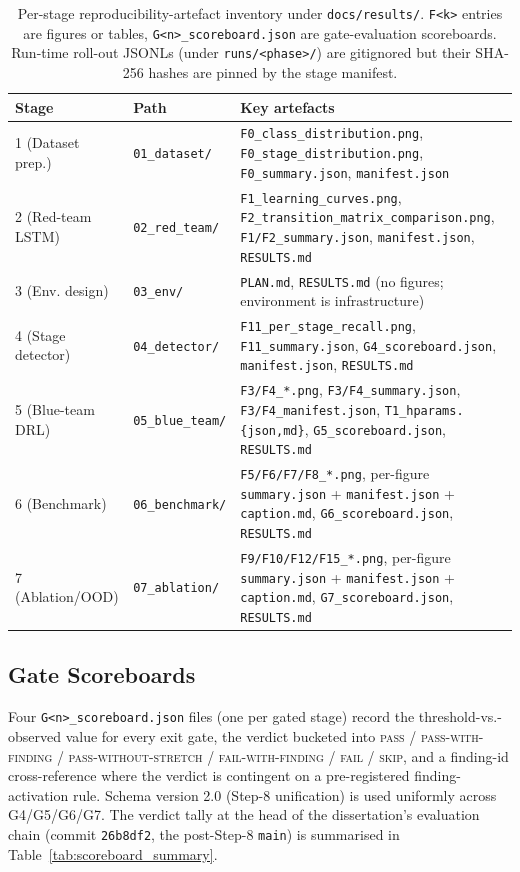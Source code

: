 \begin{table}[!htbp]
\centering
\caption{Per-stage reproducibility-artefact inventory under \texttt{docs/results/}. \texttt{F<k>} entries are figures or tables, \texttt{G<n>\_scoreboard.json} are gate-evaluation scoreboards. Run-time roll-out JSONLs (under \texttt{runs/<phase>/}) are gitignored but their SHA-256 hashes are pinned by the stage manifest.}
\label{tab:manifest_inventory}
\begin{tabular}{l l l}
\hline
Stage & Path & Key artefacts \\
\hline
1 (Dataset prep.) & \texttt{01\_dataset/} & \texttt{F0\_class\_distribution.png}, \texttt{F0\_stage\_distribution.png}, \texttt{F0\_summary.json}, \texttt{manifest.json} \\
2 (Red-team LSTM) & \texttt{02\_red\_team/} & \texttt{F1\_learning\_curves.png}, \texttt{F2\_transition\_matrix\_comparison.png}, \texttt{F1/F2\_summary.json}, \texttt{manifest.json}, \texttt{RESULTS.md} \\
3 (Env. design) & \texttt{03\_env/} & \texttt{PLAN.md}, \texttt{RESULTS.md} (no figures; environment is infrastructure) \\
4 (Stage detector) & \texttt{04\_detector/} & \texttt{F11\_per\_stage\_recall.png}, \texttt{F11\_summary.json}, \texttt{G4\_scoreboard.json}, \texttt{manifest.json}, \texttt{RESULTS.md} \\
5 (Blue-team DRL) & \texttt{05\_blue\_team/} & \texttt{F3/F4\_*.png}, \texttt{F3/F4\_summary.json}, \texttt{F3/F4\_manifest.json}, \texttt{T1\_hparams.\{json,md\}}, \texttt{G5\_scoreboard.json}, \texttt{RESULTS.md} \\
6 (Benchmark) & \texttt{06\_benchmark/} & \texttt{F5/F6/F7/F8\_*.png}, per-figure \texttt{summary.json} + \texttt{manifest.json} + \texttt{caption.md}, \texttt{G6\_scoreboard.json}, \texttt{RESULTS.md} \\
7 (Ablation/OOD) & \texttt{07\_ablation/} & \texttt{F9/F10/F12/F15\_*.png}, per-figure \texttt{summary.json} + \texttt{manifest.json} + \texttt{caption.md}, \texttt{G7\_scoreboard.json}, \texttt{RESULTS.md} \\
\hline
\end{tabular}
\end{table}

\subsection{Gate Scoreboards}\label{app:scoreboards}
Four \texttt{G<n>\_scoreboard.json} files (one per gated stage) record the threshold-vs.-observed value for every exit gate, the verdict bucketed into \textsc{pass} / \textsc{pass-with-finding} / \textsc{pass-without-stretch} / \textsc{fail-with-finding} / \textsc{fail} / \textsc{skip}, and a finding-id cross-reference where the verdict is contingent on a pre-registered finding-activation rule. Schema version 2.0 (Step-8 unification) is used uniformly across G4/G5/G6/G7. The verdict tally at the head of the dissertation's evaluation chain (commit \texttt{26b8df2}, the post-Step-8 \texttt{main}) is summarised in Table~\ref{tab:scoreboard_summary}.

